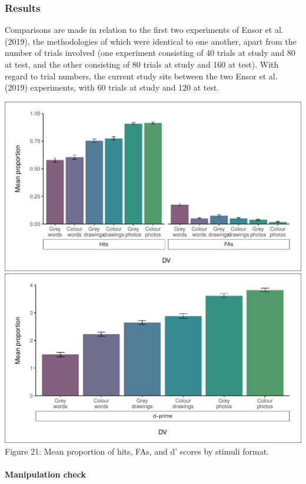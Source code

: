 \documentclass[
  11pt,
]{article}
\begin{document}
\hypertarget{results-4}{%
\subsubsection{Results}\label{results-4}}

Comparisons are made in relation to the first two experiments of Ensor
et al. (2019), the methodologies of which were identical to one another,
apart from the number of trials involved (one experiment consisting of
40 trials at study and 80 at test, and the other consisting of 80 trials
at study and 160 at test). With regard to trial numbers, the current
study sits between the two Ensor et al. (2019) experiments, with 60
trials at study and 120 at test.

\includegraphics{R--Thesis_files/figure-latex/unnamed-chunk-64-1.pdf}
\includegraphics{R--Thesis_files/figure-latex/unnamed-chunk-64-2.pdf}
Figure 21: Mean proportion of hits, FAs, and d' scores by stimuli
format.

\newpage

\hypertarget{manipulation-check}{%
\paragraph{Manipulation check}\label{manipulation-check}}
\end{document}
